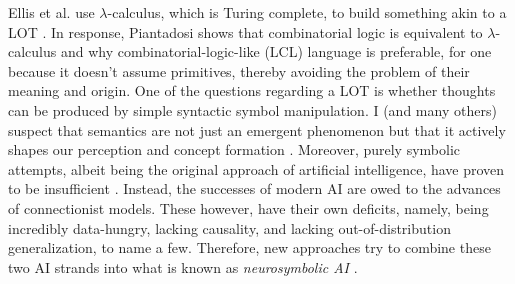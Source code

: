 Ellis et al. use $\lambda$-calculus, which is Turing complete, to build something akin to a LOT \cite{ellis_dreamcoder_2021}. In response, Piantadosi shows that combinatorial logic is equivalent to $\lambda$-calculus and why combinatorial-logic-like (LCL) language is preferable, for one because it doesn't assume primitives, thereby avoiding the problem of their meaning and origin. 
One of the questions regarding a LOT is whether thoughts can be produced by simple syntactic symbol manipulation.
I (and many others) suspect that semantics are not just an emergent phenomenon but that it actively shapes our perception and concept formation \cite{santoro2021symbolic, hofstadter_gdel_1979}.
Moreover, purely symbolic attempts, albeit being the original approach of artificial intelligence, have proven to be insufficient \cite{garcez2020neurosymbolic}. Instead, the successes of modern AI are owed to the advances of connectionist models. These however, have their own deficits, namely, being incredibly data-hungry, lacking causality, and lacking out-of-distribution generalization, to name a few. Therefore, new approaches try to combine these two AI strands into what is known as \emph{neurosymbolic AI} \cite{garcez2020neurosymbolic}.

